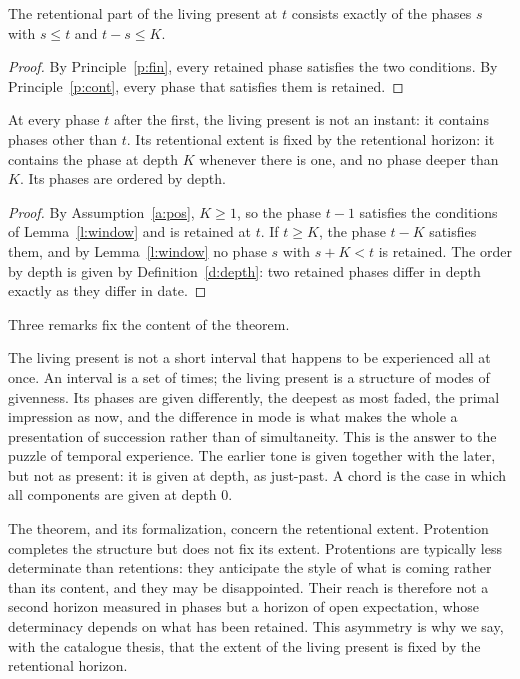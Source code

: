 \documentclass{situationist-preprint}
\begin{document}
\begin{lemma}\label{l:window}
The retentional part of the living present at $t$ consists exactly of the phases $s$ with $s\le t$ and $t-s\le K$.
\end{lemma}

\begin{proof}
By Principle~\ref{p:fin}, every retained phase satisfies the two conditions. By Principle~\ref{p:cont}, every phase that satisfies them is retained.
\end{proof}

\begin{theorem}\label{t:main}
At every phase $t$ after the first, the living present is not an instant: it contains phases other than $t$. Its retentional extent is fixed by the retentional horizon: it contains the phase at depth $K$ whenever there is one, and no phase deeper than $K$. Its phases are ordered by depth.
\end{theorem}

\begin{proof}
By Assumption~\ref{a:pos}, $K\ge 1$, so the phase $t-1$ satisfies the conditions of Lemma~\ref{l:window} and is retained at $t$. If $t\ge K$, the phase $t-K$ satisfies them, and by Lemma~\ref{l:window} no phase $s$ with $s+K<t$ is retained. The order by depth is given by Definition~\ref{d:depth}: two retained phases differ in depth exactly as they differ in date.
\end{proof}

Three remarks fix the content of the theorem.

\begin{remark}\label{r:structure}
The living present is not a short interval that happens to be experienced all at once. An interval is a set of times; the living present is a structure of modes of givenness. Its phases are given differently, the deepest as most faded, the primal impression as now, and the difference in mode is what makes the whole a presentation of succession rather than of simultaneity. This is the answer to the puzzle of temporal experience. The earlier tone is given together with the later, but not as present: it is given at depth, as just-past. A chord is the case in which all components are given at depth $0$.
\end{remark}

\begin{remark}\label{r:protention}
The theorem, and its formalization, concern the retentional extent. Protention completes the structure but does not fix its extent. Protentions are typically less determinate than retentions: they anticipate the style of what is coming rather than its content, and they may be disappointed. Their reach is therefore not a second horizon measured in phases but a horizon of open expectation, whose determinacy depends on what has been retained. This asymmetry is why we say, with the catalogue thesis, that the extent of the living present is fixed by the retentional horizon.
\end{remark}
\end{document}
